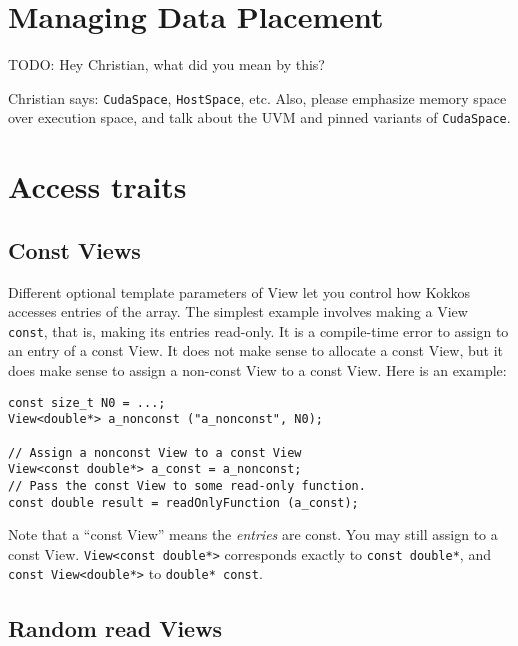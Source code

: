 \section{Managing Data Placement}\label{S:Views:Placement}

TODO: Hey Christian, what did you mean by this?

Christian says: \lstinline!CudaSpace!, \lstinline!HostSpace!, etc.
Also, please emphasize memory space over execution space, and talk
about the UVM and pinned variants of \lstinline!CudaSpace!.

\section{Access traits}\label{S:Views:AccessTraits}

\subsection{Const Views}

Different optional template parameters of View let you control how
Kokkos accesses entries of the array.  The simplest example involves
making a View \lstinline!const!, that is, making its entries read-only.  It
is a compile-time error to assign to an entry of a const View.  It
does not make sense to allocate a const View, but it does make sense
to assign a non-const View to a const View.  Here is an example:
\begin{lstlisting}
const size_t N0 = ...;
View<double*> a_nonconst ("a_nonconst", N0);

// Assign a nonconst View to a const View
View<const double*> a_const = a_nonconst;
// Pass the const View to some read-only function.
const double result = readOnlyFunction (a_const);
\end{lstlisting}
Note that a ``const View'' means the \emph{entries} are const.  You
may still assign to a const View.  \lstinline!View<const double*>!
corresponds exactly to \lstinline!const double*!, and
\lstinline!const View<double*>! to \lstinline!double* const!.

\subsection{Random read Views}

